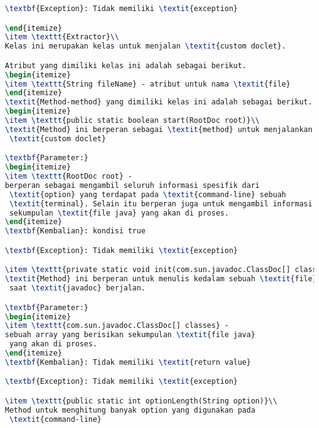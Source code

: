\begin{lstlisting}[language=TeX, caption=Hasil Pengujian kode program perangkat punak]
\textbf{Exception}: Tidak memiliki \textit{exception}

\end{itemize}
\item \texttt{Extractor}\\ 
Kelas ini merupakan kelas untuk menjalan \textit{custom doclet}.

Atribut yang dimiliki kelas ini adalah sebagai berikut.
\begin{itemize}
\item \texttt{String fileName} - atribut untuk nama \textit{file}
\end{itemize}
\textit{Method-method} yang dimiliki kelas ini adalah sebagai berikut.
\begin{itemize}
\item \texttt{public static boolean start(RootDoc root)}\\ 
\textit{Method} ini berperan sebagai \textit{method} untuk menjalankan
 \textit{custom doclet}

\textbf{Parameter:}
\begin{itemize}
\item \texttt{RootDoc root} - 
berperan sebagai mengambil seluruh informasi spesifik dari
 \textit{option} yang terdapat pada \textit{command-line} sebuah
 \textit{terminal}. Selain itu berperan juga untuk mengambil informasi dari
 sekumpulan \textit{file java} yang akan di proses.
\end{itemize}
\textbf{Kembalian}: kondisi true

\textbf{Exception}: Tidak memiliki \textit{exception}

\item \texttt{private static void init(com.sun.javadoc.ClassDoc[] classes)}\\ 
\textit{Method} ini berperan untuk menulis kedalam sebuah \textit{file}
 saat \textit{javadoc} berjalan.

\textbf{Parameter:}
\begin{itemize}
\item \texttt{com.sun.javadoc.ClassDoc[] classes} - 
sebuah array yang berisikan sekumpulan \textit{file java}
 yang akan di proses.
\end{itemize}
\textbf{Kembalian}: Tidak memiliki \textit{return value}

\textbf{Exception}: Tidak memiliki \textit{exception}

\item \texttt{public static int optionLength(String option)}\\ 
Method untuk menghitung banyak option yang digunakan pada
 \textit{command-line}


\end{lstlisting}
